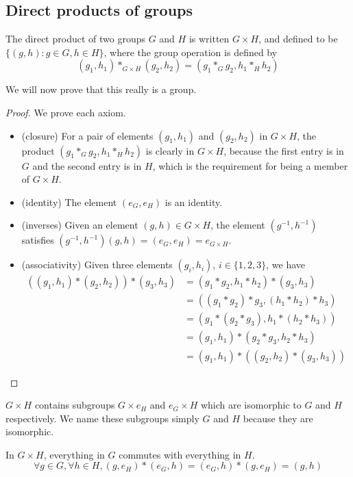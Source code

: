 \subsection{Direct products of groups}
\begin{definition}
	The direct product of two groups \(G\) and \(H\) is written \(G \times H\), and defined to be \(\{ (g, h) : g \in G, h \in H \}\), where the group operation is defined by
	\[
		(g_1, h_1) \ast_{G \times H} (g_2, h_2) = (g_1 \ast_G g_2, h_1 \ast_H h_2)
	\]
\end{definition}
We will now prove that this really is a group.
\begin{proof}
	We prove each axiom.
	\begin{itemize}
		\item (closure) For a pair of elements \((g_1, h_1)\) and \((g_2, h_2)\) in \(G \times H\), the product \((g_1 \ast_G g_2, h_1 \ast_H h_2)\) is clearly in \(G \times H\), because the first entry is in \(G\) and the second entry is in \(H\), which is the requirement for being a member of \(G \times H\).
		\item (identity) The element \((e_G, e_H)\) is an identity.
		\item (inverses) Given an element \((g, h) \in G \times H\), the element \((g^{-1}, h^{-1})\) satisfies \((g^{-1}, h^{-1})(g, h) = (e_G, e_H) = e_{G \times H}\).
		\item (associativity) Given three elements \((g_i, h_i)\), \(i \in \{1, 2, 3\}\), we have
		      \begin{align*}
			      ((g_1, h_1) \ast (g_2, h_2)) \ast (g_3, h_3) & = (g_1 \ast g_2, h_1 \ast h_2) \ast (g_3, h_3)       \\
			                                                   & = ((g_1 \ast g_2) \ast g_3, (h_1 \ast h_2) \ast h_3) \\
			                                                   & = (g_1 \ast (g_2 \ast g_3), h_1 \ast (h_2 \ast h_3)) \\
			                                                   & = (g_1, h_1) \ast (g_2 \ast g_3, h_2 \ast h_3)       \\
			                                                   & = (g_1, h_1) \ast ((g_2, h_2) \ast (g_3, h_3))
		      \end{align*}
	\end{itemize}
\end{proof}
\(G \times H\) contains subgroups \(G \times {e_H}\) and \({e_G} \times H\) which are isomorphic to \(G\) and \(H\) respectively.
We name these subgroups simply \(G\) and \(H\) because they are isomorphic.
\begin{note}
	In \(G \times H\), everything in \(G\) commutes with everything in \(H\).
	\[
		\forall g \in G, \forall h \in H, (g, e_H) \ast (e_G, h) = (e_G, h) \ast (g, e_H) = (g, h)
	\]
\end{note}

